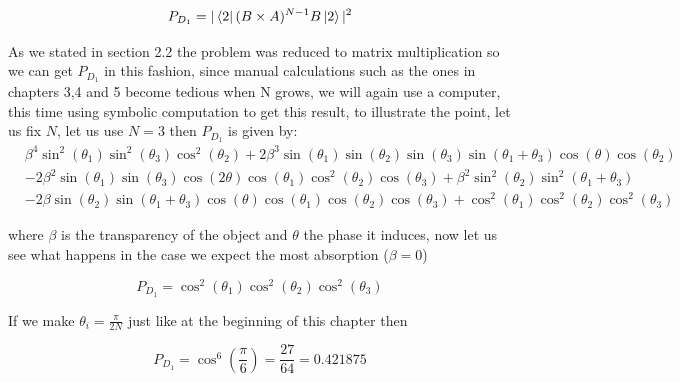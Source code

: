 \documentclass{book}
\begin{document}
\begin{equation*}
P_{D_{1}}=|\bra{2} (B \times A)^{N-1}B \ket{2}|^2
\end{equation*}

As we stated in section 2.2 the problem was reduced to matrix multiplication so we can get $P_{D_{1}}$ in this fashion, since manual calculations such as the ones in chapters 3,4 and 5 become tedious when N grows, we will again use a computer, this time using symbolic computation to get this result, to illustrate the point, let us fix $N$, let us use $N=3$ then $P_{D_{1}}$ is given by:
\small
\begin{align*}
&\beta^{4} \sin^{2}{\left(\theta_{1} \right)} \sin^{2}{\left(\theta_{3} \right)} \cos^{2}{\left(\theta_{2} \right)} + 2 \beta^{3} \sin{\left(\theta_{1} \right)} \sin{\left(\theta_{2} \right)} \sin{\left(\theta_{3} \right)} \sin{\left(\theta_{1} + \theta_{3} \right)} \cos{\left(\theta \right)} \cos{\left(\theta_{2} \right)} \\
 & - 2 \beta^{2} \sin{\left(\theta_{1} \right)} \sin{\left(\theta_{3} \right)} \cos{\left(2 \theta \right)} \cos{\left(\theta_{1} \right)} \cos^{2}{\left(\theta_{2} \right)} \cos{\left(\theta_{3} \right)} + \beta^{2} \sin^{2}{\left(\theta_{2} \right)} \sin^{2}{\left(\theta_{1} + \theta_{3} \right)} \\
 & - 2 \beta \sin{\left(\theta_{2} \right)} \sin{\left(\theta_{1} + \theta_{3} \right)} \cos{\left(\theta \right)} \cos{\left(\theta_{1} \right)} \cos{\left(\theta_{2} \right)} \cos{\left(\theta_{3} \right)} + \cos^{2}{\left(\theta_{1} \right)} \cos^{2}{\left(\theta_{2} \right)} \cos^{2}{\left(\theta_{3} \right)}
\end{align*}
\normalsize

where $\beta$ is the transparency of the object and $\theta$ the phase it induces, now let us see what happens in the case we expect the most absorption ($\beta=0$) 

\begin{equation}
P_{D_{1}}=\cos^{2}{\left(\theta_{1} \right)} \cos^{2}{\left(\theta_{2} \right)} \cos^{2}{\left(\theta_{3} \right)}
\end{equation}

If we make $\theta_{i}=\frac{\pi}{2N}$ just like at the beginning of this chapter then

\begin{equation}
P_{D_{1}}=\cos^{6}{\left(\frac{\pi}{6} \right)}=\frac{27}{64}=0.421875
\end{equation} 
\end{document}
